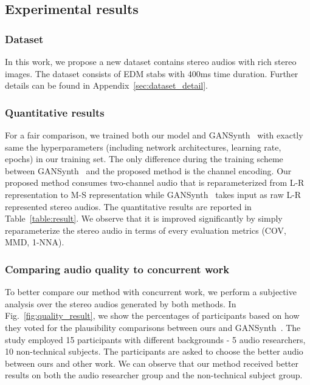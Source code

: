 \subsection{Experimental results}
\label{subsec:result}
\subsubsection{Dataset}
\label{subsubsec:dataset}
In this work, we propose a new dataset contains stereo audios with rich stereo images. The dataset consists of EDM stabs with 400ms time duration. Further details can be found in Appendix~\ref{sec:dataset_detail}. 
\fi

\subsubsection{Quantitative results}
\label{subsubsec:result}

For a fair comparison, we trained both our model and GANSynth~\cite{gansynth} with exactly same the hyperparameters (including network architectures, learning rate, epochs) in our training set. The only difference during the training scheme between GANSynth~\cite{gansynth} and the proposed method is the channel encoding. Our proposed method consumes two-channel audio that is reparameterized from L-R representation to M-S representation while GANSynth~\cite{gansynth} takes input as raw L-R represented stereo audios. The quantitative results are reported in Table~\ref{table:result}. We observe that it is improved significantly by simply reparameterize the stereo audio in terms of every evaluation metrics (COV, MMD, 1-NNA).
\vspace{-0.5em}

\subsubsection{Comparing audio quality to concurrent work}
\label{subsubsec:audio_quality}

To better compare our method with concurrent work, we perform a subjective analysis over the stereo audios generated by both methods. In Fig.~\ref{fig:quality_result}, we show the percentages of participants based on how they voted for the plausibility comparisons between ours and GANSynth~\cite{gansynth}. The study employed 15 participants with different backgrounds - 5 audio researchers, 10 non-technical subjects. The participants are asked to choose the better audio between ours and other work. We can observe that our method received better results on both the audio researcher group and the non-technical subject group.
\vspace{-0.5em}